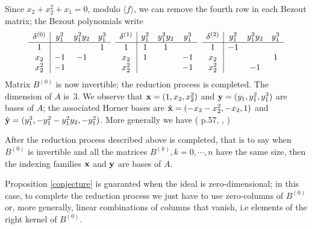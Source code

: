 \documentclass{standalone}
\begin{document}
Since $x_2 + x_2^{2} + x_1 = 0$, modulo $\langle f \rangle$, we can remove the fourth row in each Bezout matrix; the Bezout polynomials write
$$
\begin{array}{c|ccc}
	\delta^{(0)} & y_1^2 & y_1^2y_2 & y_1^3 \\
	\hline
	1  &  &  & 1 \\
	x_2  & -1 & -1 & \\
	x_2^2 & -1 &  &
\end{array}
\hspace{0.2cm}
\begin{array}{c|ccc}
	\delta^{(1)} & y_1^2 & y_1^2y_2 & y_1^3 \\
	\hline
	1  & 1 & 1 & \\
	x_2  & 1 &  & -1\\
	x_2^2  &  &  & -1
\end{array}
\hspace{0.2cm}
\begin{array}{c|ccc}
	\delta^{(2)} & y_1^2 & y_1^2y_2 & y_1^3 \\
	\hline
	1  & -1 &  & \\
	x_2  &  &  & 1 \\
	x_2^2  &  & -1 &
\end{array}$$
Matrix $B^{(0)}$ is now invertible; the reduction process is completed. The dimension of $A$ is~$3$. We observe that $\bold{x} = (1, x_2, x_2^{2})$ and $\bold{y} = (y_1, y_1^{2}, y_1^{3})$ are bases of $A$; the associated Horner bases are $\hat{\bold{x}} = (-x_2-x_2^{2}, -x_{2}, 1)$ and $\hat{\bold{y}} = (y_1^{3}, -y_1^{2}-y_1^{2}y_2, -y_1^{2})$.
More generally we have (\cite{jpc} p.57, \cite{bm}, \cite{tm})
\begin{prop}
\label{conjecture}
After the reduction process described above is completed, that is to say when $B^{(0)}$ is invertible and all the matrices $B^{(k)}, k=0, \cdots, n$ have the same size, then the indexing families $\bold{x}$ and $\bold{y}$ are bases of $A$.
\end{prop}

\begin{rem}
Proposition \ref{conjecture} is guaranted when the ideal is zero-dimensional; in this case, to complete the reduction process we just have to use zero-columns of $B^{(0)}$ or, more generally, linear combinations of columns that vanish, i.e elements of the right kernel of $B^{(0)}$.
\end{rem}
\end{document}
